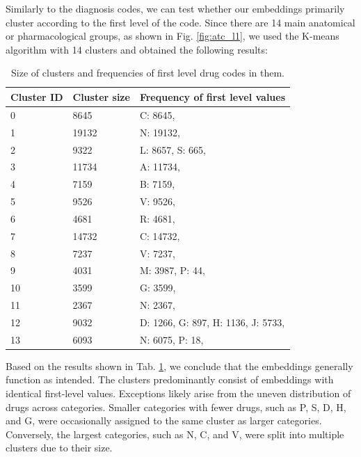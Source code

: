 Similarly to the diagnosis codes, we can test whether our embeddings primarily cluster according to the first level of the code. Since there are 14 main anatomical or pharmacological groups, as shown in Fig. \ref{fig:atc_l1}, we used the K-means algorithm with 14 clusters and obtained the following results:
\\

\begin{table}[!h]
	\centering
	\begin{tabular}{|p{}|p{}|p{}|}
		\hline
		Cluster ID & Cluster size & Frequency of first level values \\ \hline
		0 & 8645 & C: 8645, \\ \hline
		1 & 19132 & N: 19132, \\ \hline
		2 & 9322 & L: 8657, S: 665, \\ \hline
		3 & 11734 & A: 11734, \\ \hline
		4 & 7159 & B: 7159, \\ \hline
		5 & 9526 & V: 9526, \\ \hline
		6 & 4681 & R: 4681, \\ \hline
		7 & 14732 & C: 14732, \\ \hline
		8 & 7237 & V: 7237, \\ \hline
		9 & 4031 & M: 3987, P: 44, \\ \hline
		10 & 3599 & G: 3599, \\ \hline
		11 & 2367 & N: 2367, \\ \hline
		12 & 9032 & D: 1266, G: 897, H: 1136, J: 5733, \\ \hline
		13 & 6093 & N: 6075, P: 18, \\ \hline
	\end{tabular}
\caption{Size of clusters and frequencies of first level drug codes in them.}
\label{tab:drug_clusters}
\end{table}

Based on the results shown in Tab. \ref{tab:drug_clusters}, we conclude that the embeddings generally function as intended. The clusters predominantly consist of embeddings with identical first-level values. Exceptions likely arise from the uneven distribution of drugs across categories. Smaller categories with fewer drugs, such as P, S, D, H, and G, were occasionally assigned to the same cluster as larger categories. Conversely, the largest categories, such as N, C, and V, were split into multiple clusters due to their size. 
\\

